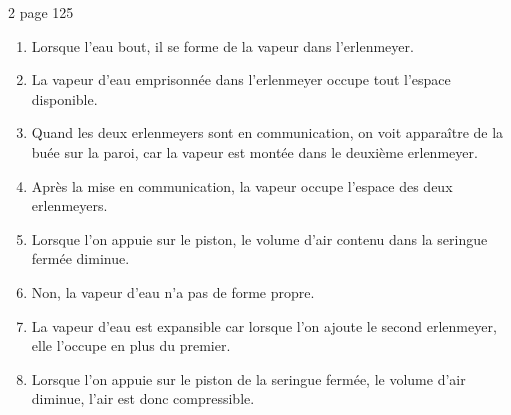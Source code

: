 \begin{myact}{2 page 125}
	\begin{enumerate}
		\item Lorsque l'eau bout, il se forme de la vapeur dans l'erlenmeyer.\pause
		\item La vapeur d'eau emprisonnée dans l'erlenmeyer occupe tout l'espace disponible.\pause
		\item Quand les deux erlenmeyers sont en communication, on voit apparaître de la buée sur la paroi, car la vapeur est montée dans le deuxième erlenmeyer.\pause
		\item Après la mise en communication, la vapeur occupe l'espace des deux erlenmeyers.\pause
		\item Lorsque l'on appuie sur le piston, le volume d'air contenu dans la seringue fermée diminue.\pause
		\item Non, la vapeur d'eau n'a pas de forme propre.\pause
		\item La vapeur d'eau est expansible car lorsque l'on ajoute le second erlenmeyer, elle l'occupe en plus du premier.\pause
		\item Lorsque l'on appuie sur le piston de la seringue fermée, le volume d'air diminue, l'air est donc compressible.
	\end{enumerate}
\end{myact}